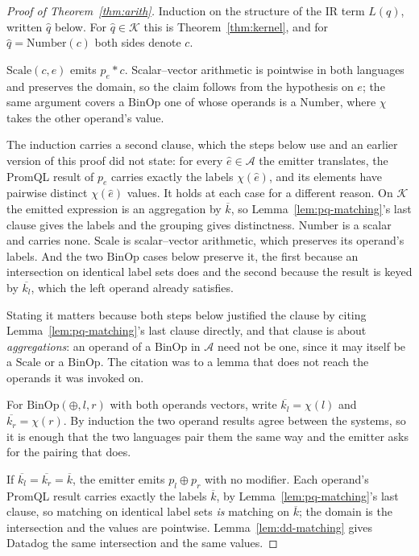 \begin{proof}[Proof of Theorem~\ref{thm:arith}]
Induction on the structure of the IR term $L(q)$, written $\hat{q}$ below. For
$\hat{q}\in\mathcal{K}$ this is Theorem~\ref{thm:kernel}, and for
$\hat{q}=\mathrm{Number}(c)$ both sides denote $c$.

$\mathrm{Scale}(c,e)$ emits $p_e * c$. Scalar--vector arithmetic is pointwise in both
languages and preserves the domain, so the claim follows from the hypothesis on $e$; the
same argument covers a $\mathrm{BinOp}$ one of whose operands is a $\mathrm{Number}$,
where $\chi$ takes the other operand's value.

The induction carries a second clause, which the steps below use and an earlier
version of this proof did not state: for every $\hat{e}\in\mathcal{A}$ the emitter
translates, the PromQL result of $p_e$ carries exactly the labels $\chi(\hat{e})$, and
its elements have pairwise distinct $\chi(\hat{e})$ values. It holds at each case for a
different reason. On $\mathcal{K}$ the emitted expression is an aggregation by
$\overline{k}$, so Lemma~\ref{lem:pq-matching}'s last clause gives the labels and the
grouping gives distinctness. $\mathrm{Number}$ is a scalar and carries none.
$\mathrm{Scale}$ is scalar--vector arithmetic, which preserves its operand's labels. And
the two $\mathrm{BinOp}$ cases below preserve it, the first because an intersection on
identical label sets does and the second because the result is keyed by
$\overline{k_l}$, which the left operand already satisfies.

Stating it matters because both steps below justified the clause by citing
Lemma~\ref{lem:pq-matching}'s last clause directly, and that clause is about
\emph{aggregations}: an operand of a $\mathrm{BinOp}$ in $\mathcal{A}$ need not be one,
since it may itself be a $\mathrm{Scale}$ or a $\mathrm{BinOp}$. The citation was to a
lemma that does not reach the operands it was invoked on.

For $\mathrm{BinOp}(\oplus,l,r)$ with both operands vectors, write
$\overline{k_l}=\chi(l)$ and $\overline{k_r}=\chi(r)$. By induction the two operand
results agree between the systems, so it is enough that the two languages pair them the
same way and the emitter asks for the pairing that does.

If $\overline{k_l}=\overline{k_r}=\overline{k}$, the emitter emits $p_l \oplus p_r$ with
no modifier. Each operand's PromQL result carries exactly the labels $\overline{k}$, by
Lemma~\ref{lem:pq-matching}'s last clause, so matching on identical label sets
\emph{is} matching on $\overline{k}$; the domain is the intersection and the values are
pointwise. Lemma~\ref{lem:dd-matching} gives Datadog the same intersection and the same
values.


\end{proof}
